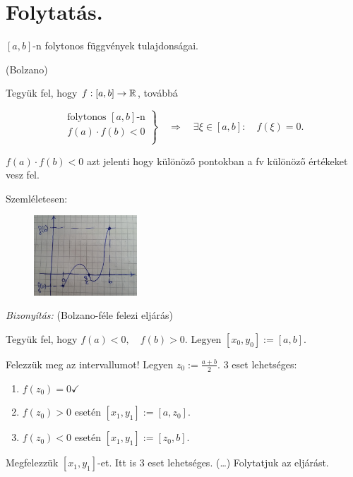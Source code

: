 \documentclass[a4paper,11.5pt]{article}
\begin{document}
	\section{Folytatás.}
	\begin{revision}
		$[a,b]$-n folytonos függvények tulajdonságai.
	\end{revision}
	\begin{theorem}
		(Bolzano)
		
		Tegyük fel, hogy $f:[a,b]\to\mathbb{R}$, továbbá
		
		\[\left.\begin{gathered}
			\text{folytonos } [a,b]\text{-n}\\
			f(a)\cdot f(b)<0\\
		\end{gathered}\right\}\quad \Rightarrow\quad \exists\xi\in[a,b]:\quad f(\xi)=0. \]
		\begin{note}
			$f(a)\cdot f(b) < 0$ azt jelenti hogy különöző pontokban a fv különöző értékeket vesz fel.
		\end{note}
		Szemléletesen:
		
		\begin{figure}[!h]
			\centering
			\includegraphics[height=3cm]{kepek/bolzano_theorem.jpg}
			\caption{}\label{fig_bolzano}
		\end{figure}
		\textit{Bizonyítás:} (Bolzano-féle felezi eljárás)
		
		Tegyük fel, hogy $f(a)<0,\quad  f(b)>0.$ \quad Legyen $[x_0, y_0]:=[a,b]$.
		
		\medskip
		Felezzük meg az intervallumot! Legyen $z_0:=\frac{a+b}{2}$. 3 eset lehetséges:
		\begin{enumerate}
			\item $f(z_0)=0 \checkmark$
			\item $f(z_0)>0$ esetén $[x_1,y_1]:=[a,z_0]$.
			\item $f(z_0)<0$ esetén $[x_1,y_1]:=[z_0,b].$
		\end{enumerate}
		Megfelezzük $[x_1,y_1]$-et. Itt is 3 eset lehetséges. (\ldots) Folytatjuk az eljárást.
		

\end{theorem}
\end{document}
